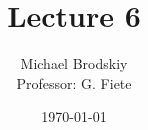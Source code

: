 


\title{Lecture 6}
\date{\today}
\author{Michael Brodskiy\\ \small Professor: G. Fiete}



\maketitle

